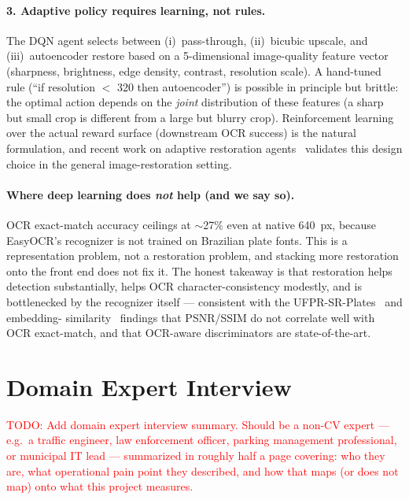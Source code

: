 \documentclass[11pt]{article}
\begin{document}
\paragraph{3. Adaptive policy requires learning, not rules.}
The DQN agent selects between (i)~pass-through, (ii)~bicubic upscale, and
(iii)~autoencoder restore based on a 5-dimensional image-quality feature
vector (sharpness, brightness, edge density, contrast, resolution scale).
A hand-tuned rule (``if resolution $<$ 320 then autoencoder'') is possible
in principle but brittle: the optimal action depends on the \emph{joint}
distribution of these features (a sharp but small crop is different from a
large but blurry crop). Reinforcement learning over the actual reward
surface (downstream OCR success) is the natural formulation, and recent work
on adaptive restoration agents~\cite{restoreagent} validates this design
choice in the general image-restoration setting.

\paragraph{Where deep learning does \emph{not} help (and we say so).}
OCR exact-match accuracy ceilings at $\sim$27\% even at native 640~px,
because EasyOCR's recognizer is not trained on Brazilian plate fonts.
This is a representation problem, not a restoration problem, and stacking
more restoration onto the front end does not fix it. The honest takeaway
is that restoration helps detection substantially, helps OCR
character-consistency modestly, and is bottlenecked by the recognizer
itself --- consistent with the UFPR-SR-Plates~\cite{ufprsr} and embedding-
similarity~\cite{embedsim} findings that PSNR/SSIM do not correlate well
with OCR exact-match, and that OCR-aware discriminators are state-of-the-art.

\section{Domain Expert Interview}

\textcolor{red}{TODO: Add domain expert interview summary. Should be a
non-CV expert --- e.g.\ a traffic engineer, law enforcement officer,
parking management professional, or municipal IT lead --- summarized in
roughly half a page covering: who they are, what operational pain point
they described, and how that maps (or does not map) onto what this project
measures.}
\end{document}
